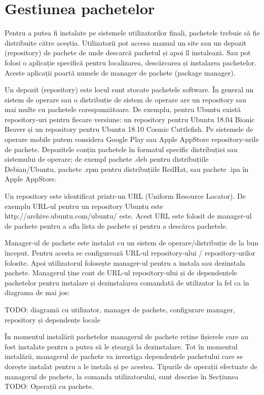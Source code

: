 \section{Gestiunea pachetelor}
\label{sec:package:manage}

Pentru a putea fi instalate pe sistemele utilizatorilor finali, pachetele trebuie să fie distribuite către aceștia. Utilizatorii pot accesa manual un site sau un depozit (repository) de pachete de unde descarcă pachetul și apoi îl instalează. Sau pot folosi o aplicație specifică pentru localizarea, descărcarea și instalarea pachetelor. Aceste aplicații poartă numele de manager de pachete (package manager).

Un depozit (repository) este locul sunt stocate pachetele software. În general un sistem de operare sau o distribuție de sistem de operare are un repository sau mai multe cu pachetele corespunzătoare. De exemplu, pentru Ubuntu există repository-uri pentru fiecare versiune: un repository pentru Ubuntu 18.04 Bionic Beaver și un repository pentru Ubuntu 18.10 Cosmic Cuttlefish. Pe sistemele de operare mobile putem considera Google Play sau Apple AppStore repository-urile de pachete. Depozitele conțin pachetele în formatul specific distribuției sau sistemului de operare; de exempl pachete .deb pentru distribuțiile Debian/Ubuntu, pachete .rpm pentru distribuțiile RedHat, sau pachete .ipa în Apple AppStore.

Un repository este identificat printr-un URL (Uniform Resource Locator). De exemplu URL-ul pentru un repository Ubuntu este http://archive.ubuntu.com/ubuntu/ este. Acest URL este folosit de manager-ul de pachete pentru a afla lista de pachete și pentru a descărca pachetele.

Manager-ul de pachete este instalat cu un sistem de operare/distribuție de la bun început. Pentru acesta se configurează URL-ul repository-ului / repository-urilor folosite. Apoi utilizatorul folosește manager-ul pentru a instala sau dezinstala pachete. Managerul ține cont de URL-ul repository-ului și de dependențele pachetelor pentru instalare și dezinstalarea comandată de utilizator la fel ca în diagrama de mai jos:

TODO: diagramă cu utilizator, manager de pachete, configurare manager, repository și dependențe locale

În momentul instalării pachetelor managerul de pachete reține fișierele care au fost instalate pentru a putea să le șteargă la dezinstalare. Tot în momentul instalării, managerul de pachete va investiga dependențele pachetului care se dorește instalat pentru a le instala și pe acestea. Tipurile de operații efectuate de managerul de pachete, la comanda utilizatorului, sunt descrise în Secțiunea TODO: Operații cu pachete.

